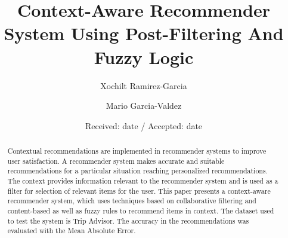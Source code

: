 \providecommand\foo{}
\renewcommand\foo{...}


\title{Context-Aware Recommender System Using Post-Filtering And Fuzzy Logic
}
\subtitle{}


\author{Xochilt Ramirez-Garcia \and Mario Garcia-Valdez %
}



\date{Received: date / Accepted: date}

\maketitle

\begin{abstract} 

Contextual recommendations are implemented in recommender systems to improve
user satisfaction. A recommender system makes accurate and suitable
recommendations for a particular situation reaching personalized
recommendations.
The context provides information relevant to the recommender
system and is used as a filter for selection of relevant items for the user.
This paper presents a context-aware recommender system, which uses techniques
based on collaborative filtering and content-based as well as fuzzy rules to
recommend items in context. The dataset used to test the system is Trip Advisor.
The accuracy in the recommendations was evaluated with the Mean Absolute Error.

\end{abstract}

